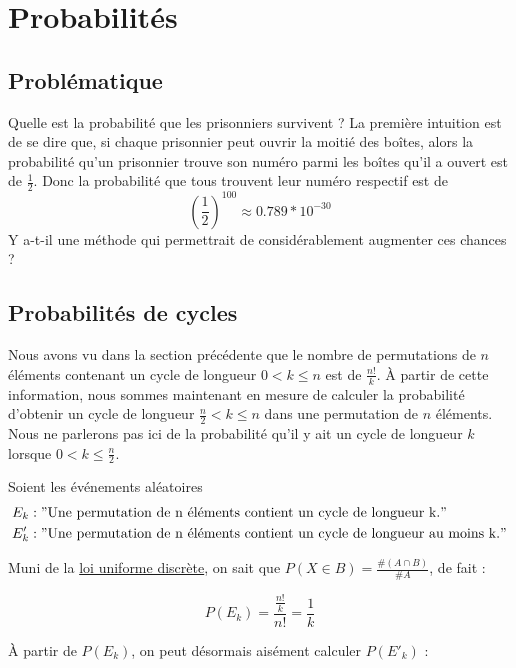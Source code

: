 \section{Probabilités}
\subsection{Problématique}

	Quelle est la probabilité que les prisonniers survivent ?
	La première intuition est de se dire que, si chaque prisonnier peut ouvrir la moitié des boîtes, alors la probabilité qu'un prisonnier
	trouve son numéro parmi les boîtes qu'il a ouvert est de $\frac{1}{2}$. Donc la probabilité que tous trouvent leur
	numéro respectif est de $$\left(\frac{1}{2}\right)^{100} \approx 0.789 * 10^{-30}$$
	Y a-t-il une méthode qui permettrait de considérablement augmenter ces chances ?

\subsection{Probabilités de cycles}

	Nous avons vu dans la section précédente que le nombre de permutations de $n$ éléments contenant un cycle de longueur $0 < k \leq n$ est de $\frac{n!}{k}$.
	À partir de cette information, nous sommes maintenant en mesure de calculer la probabilité d'obtenir un cycle de longueur $\frac{n}{2} < k \leq n$ dans une permutation de $n$ éléments.
	Nous ne parlerons pas ici de la probabilité qu'il y ait un cycle de longueur $k$ lorsque $0 < k \leq \frac{n}{2}$.

	Soient les événements aléatoires
	\begin{align*}
		E_k  & : "\text{Une permutation de n éléments contient un cycle de longueur k.}"          \\
		E'_k & : "\text{Une permutation de n éléments contient un cycle de longueur au moins k.}"
	\end{align*}

	Muni de la \href{https://fr.wikipedia.org/wiki/Loi_uniforme_discr%C3%A8te#Calcul_d'une_probabilit%C3%A9}{loi uniforme discrète}, on sait que $P(X \in B) = \frac{\#(A \cap B)}{\#A}$, de fait :

	\begin{equation}
		P(E_k) = \frac{\frac{n!}{k}}{n!} = \frac{1}{k}
	\end{equation}

	À partir de $P(E_k)$, on peut désormais aisément calculer $P(E'_k)$ :

